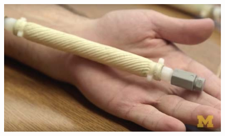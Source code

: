 \begin{figure}
\centering

\def\picScale{0.08}    %
\def\colWidth{0.5\linewidth}

{\includegraphics[width=0.95\linewidth]{figures/FREEhand.jpg}} %


\end{figure}
